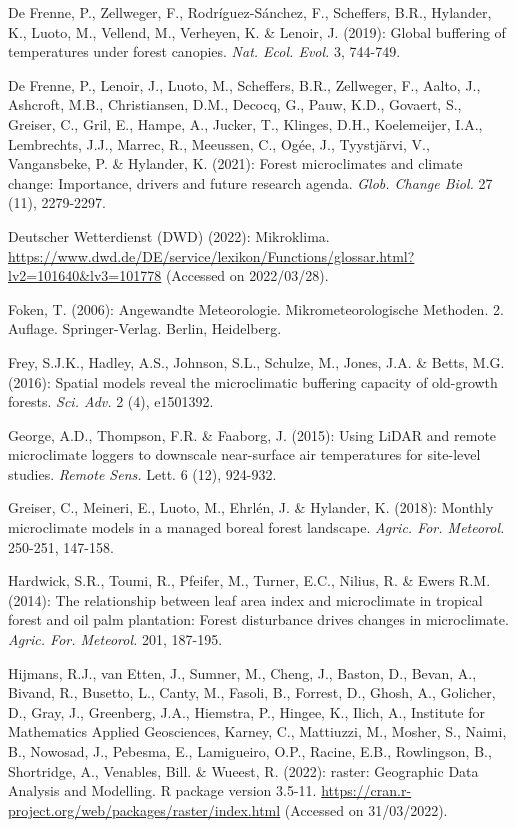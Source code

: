 \documentclass[5p]{elsarticle} %
\newlength{\cslhangindent}
\newlength{\cslentryspacingunit} %
\newenvironment{CSLReferences}[2] %
 {%
  \setlength{\parindent}{0pt}
  \ifodd #1
  \let\oldpar\par
  \def\par{\hangindent=\cslhangindent\oldpar}
  \fi
  \setlength{\parskip}{#2\cslentryspacingunit}
 }%
 {}
\begin{document}
\begin{CSLReferences}{1}{0}
De Frenne, P., Zellweger, F., Rodríguez-Sánchez, F., Scheffers, B.R., Hylander, K., Luoto, M., Vellend, M., Verheyen, K. \& Lenoir, J. (2019): Global buffering of temperatures under forest canopies. \emph{Nat. Ecol. Evol.} 3, 744-749.

De Frenne, P., Lenoir, J., Luoto, M., Scheffers, B.R., Zellweger, F., Aalto, J., Ashcroft, M.B., Christiansen, D.M., Decocq, G., Pauw, K.D., Govaert, S., Greiser, C., Gril, E., Hampe, A., Jucker, T., Klinges, D.H., Koelemeijer, I.A., Lembrechts, J.J., Marrec, R., Meeussen, C., Ogée, J., Tyystjärvi, V., Vangansbeke, P. \& Hylander, K. (2021): Forest microclimates and climate change: Importance, drivers and future research agenda. \emph{Glob. Change Biol.} 27 (11), 2279-2297.

Deutscher Wetterdienst (DWD) (2022): Mikroklima. \url{https://www.dwd.de/DE/service/lexikon/Functions/glossar.html?lv2=101640&lv3=101778} (Accessed on 2022/03/28).

Foken, T. (2006): Angewandte Meteorologie. Mikrometeorologische Methoden. 2. Auflage. Springer-Verlag. Berlin, Heidelberg.

Frey, S.J.K., Hadley, A.S., Johnson, S.L., Schulze, M., Jones, J.A. \& Betts, M.G. (2016): Spatial models reveal the microclimatic buffering capacity of old-growth forests. \emph{Sci. Adv.} 2 (4), e1501392.

George, A.D., Thompson, F.R. \& Faaborg, J. (2015): Using LiDAR and remote microclimate loggers to downscale near-surface air temperatures for site-level studies. \emph{Remote Sens.} Lett. 6 (12), 924-932.

Greiser, C., Meineri, E., Luoto, M., Ehrlén, J. \& Hylander, K. (2018): Monthly microclimate models in a managed boreal forest landscape. \emph{Agric. For. Meteorol.} 250-251, 147-158.

Hardwick, S.R., Toumi, R., Pfeifer, M., Turner, E.C., Nilius, R. \& Ewers R.M. (2014): The relationship between leaf area index and microclimate in tropical forest and oil palm plantation: Forest disturbance drives changes in microclimate. \emph{Agric. For. Meteorol.} 201, 187-195.

Hijmans, R.J., van Etten, J., Sumner, M., Cheng, J., Baston, D., Bevan, A., Bivand, R., Busetto, L., Canty, M., Fasoli, B., Forrest, D., Ghosh, A., Golicher, D., Gray, J., Greenberg, J.A., Hiemstra, P., Hingee, K., Ilich, A., Institute for Mathematics Applied Geosciences, Karney, C., Mattiuzzi, M., Mosher, S., Naimi, B., Nowosad, J., Pebesma, E., Lamigueiro, O.P., Racine, E.B., Rowlingson, B., Shortridge, A., Venables, Bill. \& Wueest, R. (2022): raster: Geographic Data Analysis and Modelling. R package version 3.5-11. \url{https://cran.r-project.org/web/packages/raster/index.html} (Accessed on 31/03/2022).


\end{CSLReferences}
\end{document}
